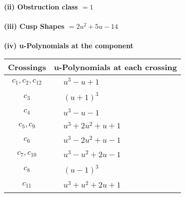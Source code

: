 \documentclass[1p]{elsarticle_modified}
\theoremstyle{definition}
\begin{document}
\flushleft \textbf{(ii) Obstruction class $= 1$}\\~\\
\flushleft \textbf{(iii) Cusp Shapes $= 2 u^2+5 u-14$}\\~\\
\newpage\renewcommand{\arraystretch}{1}
\flushleft \textbf{(iv) u-Polynomials at the component}\newline \\
\begin{tabular}{m{50pt}|m{274pt}}
Crossings & \hspace{64pt}u-Polynomials at each crossing \\
\hline $$\begin{aligned}c_{1},c_{2},c_{12}\end{aligned}$$&$\begin{aligned}
&u^3- u+1
\end{aligned}$\\
\hline $$\begin{aligned}c_{3}\end{aligned}$$&$\begin{aligned}
&(u+1)^3
\end{aligned}$\\
\hline $$\begin{aligned}c_{4}\end{aligned}$$&$\begin{aligned}
&u^3- u-1
\end{aligned}$\\
\hline $$\begin{aligned}c_{5},c_{9}\end{aligned}$$&$\begin{aligned}
&u^3+2 u^2+u+1
\end{aligned}$\\
\hline $$\begin{aligned}c_{6}\end{aligned}$$&$\begin{aligned}
&u^3-2 u^2+u-1
\end{aligned}$\\
\hline $$\begin{aligned}c_{7},c_{10}\end{aligned}$$&$\begin{aligned}
&u^3- u^2+2 u-1
\end{aligned}$\\
\hline $$\begin{aligned}c_{8}\end{aligned}$$&$\begin{aligned}
&(u-1)^3
\end{aligned}$\\
\hline $$\begin{aligned}c_{11}\end{aligned}$$&$\begin{aligned}
&u^3+u^2+2 u+1
\end{aligned}$\\
\hline
\end{tabular}\\~\\
\end{document}
